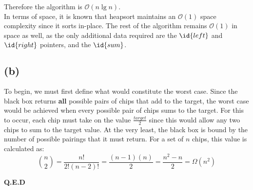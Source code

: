     Therefore the algorithm is $\mathcal{O}(n\lg{n})$.\\

    In terms of space, it is known that heapsort maintains an $\mathcal{O}(1)$ space complexity since it sorts in-place.
    The rest of the algorithm remains $\mathcal{O}(1)$ in space as well, as the only additional data required are the $\id{left}$ and $\id{right}$ pointers, and the $\id{sum}$.

    \subsection{(b)}
    To begin, we must first define what would constitute the worst case.
    Since the black box returns \textbf{all} possible pairs of chips that add to the target, the worst case would be achieved when every possible pair of chips sums to the target.
    For this to occur, each chip must take on the value $\frac{target}{2}$ since this would allow any two chips to sum to the target value.
    At the very least, the black box is bound by the number of possible pairings that it must return.
    \vspace{-4mm}
    For a set of $n$ chips, this value is calculated as:
    \[\binom{n}{2} = \frac{n!}{2!(n-2)!} = \frac{(n-1)(n)}{2} = \frac{n^2-n}{2} = \Omega(n^2)\]

    \textbf{Q.E.D}
